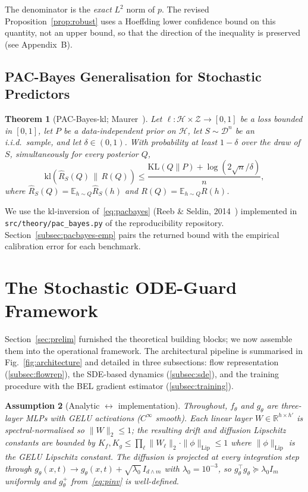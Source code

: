 \documentclass{ieeeaccess}
\newtheorem{theorem}{Theorem}
\newtheorem{assumption}[theorem]{Assumption}
\newcommand{\Real}{\mathbb{R}}
\newcommand{\Exp}{\mathbb{E}}
\newcommand{\KL}{\mathrm{KL}}
\newcommand{\Lip}{\mathrm{Lip}}
\newcommand{\Hcal}{\mathcal{H}}
\newcommand{\Dcal}{\mathcal{D}}
\newcommand{\Zcal}{\mathcal{Z}}
\newcommand{\pinv}{{+}}   %
\begin{document}
The denominator is the \emph{exact} $L^{2}$ norm of $p$. The revised
Proposition~\ref{prop:robust} uses a Hoeffding lower confidence bound
on this quantity, not an upper bound, so that the direction of the
inequality is preserved (see Appendix~B).

\subsection{PAC-Bayes Generalisation for Stochastic Predictors}
\label{subsec:pacbayes}
\begin{theorem}[PAC-Bayes-kl; Maurer~\cite{maurer2004pacbayes}]\label{thm:pacbayes}
Let $\ell:\Hcal\times\Zcal\!\to\![0,1]$ be a loss bounded in $[0,1]$,
let $P$ be a data-independent prior on $\Hcal$, let $S\sim\Dcal^n$ be
an i.i.d.\ sample, and let $\delta\in(0,1)$. With probability at least
$1-\delta$ over the draw of $S$, simultaneously for every posterior
$Q$,
\begin{equation}\label{eq:pacbayes}
 \mathrm{kl}\!\left(\widehat{R}_S(Q)\,\big\|\,R(Q)\right)
   \leq \frac{\KL(Q\|P)+\log(2\sqrt{n}/\delta)}{n},
\end{equation}
where $\widehat R_S(Q)=\Exp_{h\sim Q}\widehat R_S(h)$ and
$R(Q)=\Exp_{h\sim Q}R(h)$.
\end{theorem}

We use the kl-inversion of~\eqref{eq:pacbayes} (Reeb \& Seldin,
2014~\cite{reeb2014klinv}) implemented in
\texttt{src/theory/pac\_bayes.py} of the reproducibility repository.
Section~\ref{subsec:pacbayes-emp} pairs the returned bound with the
empirical calibration error for each benchmark.

\section{The Stochastic ODE-Guard Framework}\label{sec:framework}
Section~\ref{sec:prelim} furnished the theoretical building blocks;
we now assemble them into the operational framework. The architectural
pipeline is summarised in Fig.~\ref{fig:architecture} and detailed in
three subsections: flow representation (\ref{subsec:flowrep}), the
SDE-based dynamics (\ref{subsec:sde}), and the training procedure with
the BEL gradient estimator (\ref{subsec:training}).

\begin{assumption}[Analytic $\leftrightarrow$ implementation]\label{ass:impl}
Throughout, $f_\theta$ and $g_\theta$ are three-layer MLPs with GELU
activations ($C^{\infty}$ smooth). Each linear layer $W\in\Real^{h\times h'}$
is spectral-normalised so $\|W\|_{2}\leq 1$; the resulting drift and
diffusion Lipschitz constants are bounded by
$K_f, K_g \leq \prod_\ell \|W_\ell\|_2 \cdot \|\phi\|_\Lip \leq 1$
where $\|\phi\|_\Lip$ is the GELU Lipschitz constant. The diffusion is
projected at every integration step through
$g_\theta(x,t)\to g_\theta(x,t)+\sqrt{\lambda_0}\,I_{d\wedge m}$ with
$\lambda_0=10^{-3}$, so $g_\theta^\top g_\theta \succeq \lambda_0 I_m$
uniformly and $g_\theta^{\pinv}$ from~\eqref{eq:pinv} is well-defined.
\end{assumption}
\end{document}

